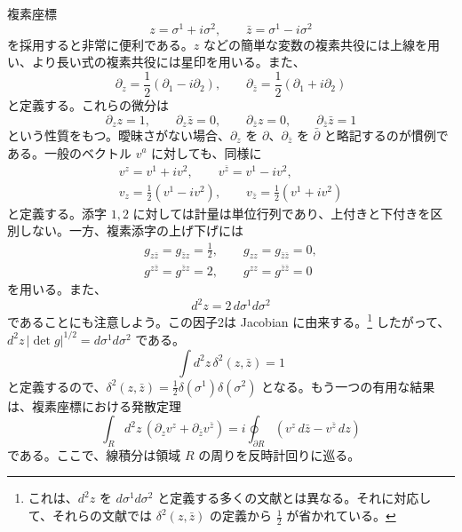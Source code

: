 複素座標
\begin{equation}
z=\sigma^1+i\sigma^2,\qquad \bar z=\sigma^1-i\sigma^2
\tag{2.1.2}\label{eq:2.1.2}
\end{equation}
を採用すると非常に便利である。$z$ などの簡単な変数の複素共役には上線を用い、より長い式の複素共役には星印を用いる。また、
\begin{equation}
\partial_z=\frac12(\partial_1-i\partial_2),\qquad
\partial_{\bar z}=\frac12(\partial_1+i\partial_2)
\tag{2.1.3}\label{eq:2.1.3}
\end{equation}
と定義する。これらの微分は
\begin{equation}
\partial_z z=1,\qquad \partial_z\bar z=0,\qquad
\partial_{\bar z}z=0,\qquad \partial_{\bar z}\bar z=1
\tag{2.1.4}\label{eq:2.1.4}
\end{equation}
という性質をもつ。曖昧さがない場合、$\partial_z$ を $\partial$、$\partial_{\bar z}$ を $\bar\partial$ と略記するのが慣例である。一般のベクトル $v^a$ に対しても、同様に
\begin{equation}
\begin{gathered}
v^z=v^1+iv^2,\qquad v^{\bar z}=v^1-iv^2,\\
v_z=\frac12(v^1-iv^2),\qquad
v_{\bar z}=\frac12(v^1+iv^2)
\end{gathered}
\tag{2.1.5}\label{eq:2.1.5}
\end{equation}
と定義する。添字 $1,2$ に対しては計量は単位行列であり、上付きと下付きを区別しない。一方、複素添字の上げ下げには
\begin{equation}
\begin{gathered}
g_{z\bar z}=g_{\bar z z}=\frac12,\qquad
g_{zz}=g_{\bar z\bar z}=0,\\
g^{z\bar z}=g^{\bar z z}=2,\qquad
g^{zz}=g^{\bar z\bar z}=0
\end{gathered}
\tag{2.1.6}\label{eq:2.1.6}
\end{equation}
を用いる。また、
\begin{equation}
d^2z=2\,d\sigma^1d\sigma^2
\tag{2.1.7}\label{eq:2.1.7}
\end{equation}
であることにも注意しよう。この因子2は Jacobian に由来する。\footnote[1]{これは、$d^2z$ を $d\sigma^1d\sigma^2$ と定義する多くの文献とは異なる。それに対応して、それらの文献では $\delta^2(z,\bar z)$ の定義から $\tfrac12$ が省かれている。}
したがって、$d^2z\,|\det g|^{1/2}=d\sigma^1d\sigma^2$ である。
\begin{equation}
\int d^2z\,\delta^2(z,\bar z)=1
\tag{2.1.8}\label{eq:2.1.8}
\end{equation}
と定義するので、$\delta^2(z,\bar z)=\tfrac12\delta(\sigma^1)\delta(\sigma^2)$ となる。もう一つの有用な結果は、複素座標における発散定理
\begin{equation}
\int_Rd^2z\,(\partial_zv^z+\partial_{\bar z}v^{\bar z})
=i\oint_{\partial R}(v^z\,d\bar z-v^{\bar z}\,dz)
\tag{2.1.9}\label{eq:2.1.9}
\end{equation}
である。ここで、線積分は領域 $R$ の周りを反時計回りに巡る。

